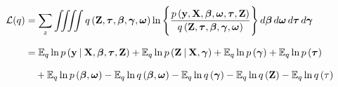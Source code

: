 \documentclass[twoside,11pt]{article}
\newcommand\given[1][]{\:#1\vert\:}
\newcommand{\boldbeta}{\boldsymbol\beta}
\newcommand{\boldgamma}{\boldsymbol\gamma}
\newcommand{\boldomega}{\boldsymbol\omega}
\newcommand{\boldtau}{\boldsymbol\tau}
\newcommand{\E}{\mathbb{E}}
\begin{document}
\begin{equation} \label{eq:ELBO}
\setlength{\jot}{11pt}
\begin{split}
	\mathcal{L}(q) &= \sum_{z} \iiiint q\left(\mathbf{Z}, \boldtau, \boldbeta, \boldgamma, \boldsymbol \omega\right)
	\ln \Bigg\{ \frac{p\left(\mathbf{y}, \mathbf{X}, \boldbeta, \boldsymbol\omega, \boldtau, \mathbf{Z}\right)}{q \left(\mathbf{Z}, \boldtau, \boldbeta, \boldgamma, \boldsymbol \omega \right)}\Bigg\}\, d\boldbeta\, d\boldsymbol\omega\, d\boldtau\, d\boldgamma \\
	&= \E_q \ln p\left( \mathbf{y} \given \mathbf{X}, \boldbeta, \boldtau, \mathbf{Z} \right) + \E_q \ln p\left( \mathbf{Z} \given \mathbf{X}, \boldgamma \right) + \E_q \ln p\left( \boldgamma \right) + \E_q \ln p\left( \boldtau \right) \\ & \quad + \E_q \ln p\left( \boldbeta, \boldomega \right) - \E_q \ln q\left( \boldbeta, \boldomega \right) - 
	\E_q \ln q\left( \boldgamma \right) - \E_q \ln q\left( \mathbf{Z} \right) - \E_q \ln q\left( \mathbf{\tau} \right)
\end{split}
\end{equation}
\end{document}
